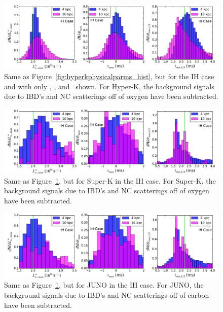 \begin{figure}[h]
\centerline{\includegraphics[width=\linewidth]{wh07_15_40g_HyperK_realparameters_histogram_oscillations_backgrounds_IH.pdf}}
\caption{\label{fig:hyperkphysicalparms_hist_ih} Same as
  Figure~\ref{fig:hyperkphysicalparms_hist}, but for the IH case and
  with only \lmax, \tmax, and \trise\ shown.  For Hyper-K, the
  background signals due to IBD's and NC scatterings off of oxygen
  have been subtracted.}
\end{figure}


\begin{figure}[h]
\centerline{\includegraphics[width=\linewidth]{wh07_15_40g_SuperK_realparameters_histogram_oscillations_backgrounds_IH.pdf}}
\caption{\label{fig:superkphysicalparms_hist_ih} Same as
  Figure~\ref{fig:hyperkphysicalparms_hist_ih}, but for Super-K in the
  IH case.  For Super-K, the
  background signals due to IBD's and NC scatterings off of oxygen
  have been subtracted.}
\end{figure}
\afterpage{\clearpage}

\begin{figure}[h]
\centerline{\includegraphics[width=\linewidth]{wh07_15_40g_JUNO_realparameters_histogram_oscillations_backgrounds_IH.pdf}}
\caption{\label{fig:junophysicalparms_hist_ih} Same as
  Figure~\ref{fig:hyperkphysicalparms_hist_ih}, but for JUNO in the
  IH case.  For JUNO, the
  background signals due to IBD's and NC scatterings off of carbon
  have been subtracted.}
\end{figure}



